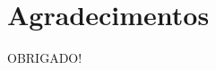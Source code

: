
\AtBeginSection[]{
	\begin{frame}
		\frametitle{}
		\tableofcontents[currentsection]
	\end{frame}
}

 
 \section{Agradecimentos}
	\begin{frame}{}
		\centering\Huge OBRIGADO!
	\end{frame}
